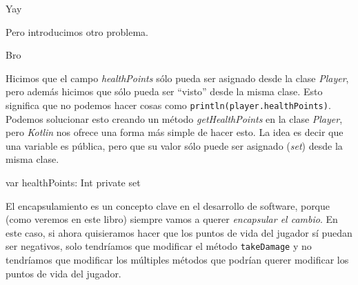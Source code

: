   \begin{center}
    Yay
  \end{center}

  Pero introducimos otro problema.

  \begin{center}
    Bro
  \end{center}

  Hicimos que el campo \textit{healthPoints} sólo pueda ser asignado desde la clase 
  \textit{Player}, pero además hicimos que sólo pueda ser \enquote{visto} desde la misma clase.
  Esto significa que no podemos hacer cosas como \texttt{println(player.healthPoints)}.
  Podemos solucionar esto creando un método \textit{getHealthPoints} en la clase \textit{Player},
  pero \textit{Kotlin} nos ofrece una forma más simple de hacer esto.
  La idea es decir que una variable es pública, pero que su valor sólo puede ser asignado 
  (\textit{set}) desde la misma clase.

  \begin{kotlin}
    var healthPoints: Int private set
  \end{kotlin}

  El encapsulamiento es un concepto clave en el desarrollo de software, porque (como veremos en este 
  libro) siempre vamos a querer \textit{encapsular el cambio}.
  En este caso, si ahora quisieramos hacer que los puntos de vida del jugador sí puedan ser 
  negativos, solo tendríamos que modificar el método \texttt{takeDamage} y no tendríamos que
  modificar los múltiples métodos que podrían querer modificar los puntos de vida del jugador.
  